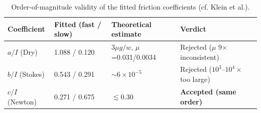 \begin{table}[h]\centering
\caption{Order-of-magnitude validity of the fitted friction coefficients (cf. Klein et al.).}
\label{tab:validity}
\begin{tabular}{llll}
\toprule
Coefficient & Fitted (fast / slow) & Theoretical estimate & Verdict \\
\midrule
$a/I$ (Dry) & 1.088 / 0.120 & $3\mu g/w$, $\mu$=0.031/0.0034 & Rejected ($\mu$ 9$\times$ inconsistent) \\
$b/I$ (Stokes) & 0.543 / 0.291 & $\sim 6\times10^{-5}$ & Rejected ($10^3$--$10^4\times$ too large) \\
$c/I$ (Newton) & 0.271 / 0.675 & $\lesssim 0.30$ & \textbf{Accepted (same order)} \\
\bottomrule
\end{tabular}
\end{table}
